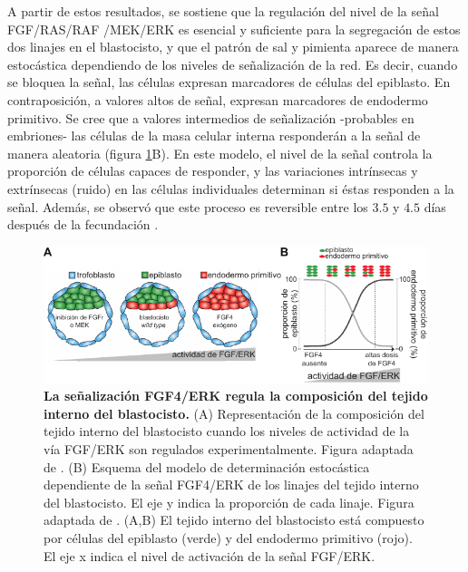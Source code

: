 \documentclass[./main.tex]{subfiles}
\begin{document}
A partir de estos resultados, se sostiene que la regulación del nivel de la señal FGF/RAS/RAF /MEK/ERK es esencial y suficiente para la segregación de estos dos linajes en el blastocisto, y que el patrón de sal y pimienta aparece de manera estocástica dependiendo de los niveles de señalización de la red. Es decir, cuando se bloquea la señal, las células expresan marcadores de células del epiblasto. En contraposición, a valores altos de señal, expresan marcadores de endodermo primitivo. Se cree que a valores intermedios de señalización -probables en embriones- las células de la masa celular interna responderán a la señal de manera aleatoria (figura \ref{C1_fig:saltandpepper}B). En este modelo, el nivel de la señal controla la proporción de células capaces de responder, y las variaciones intrínsecas y extrínsecas (ruido) en las células individuales determinan si éstas responden a la señal. Además, se observó que este proceso es reversible entre los $3.5$ y $4.5$ días después de la fecundación \cite{Yamanaka2010,Pokrass2020}.

\begin{figure}
    \centering
    \includegraphics[width=1\columnwidth]{figures/chapter1/C1_saltandpepper.pdf} 
    \caption{\textbf{La señalización FGF4/ERK regula la composición del tejido interno del blastocisto.} (A) Representación de la composición del tejido interno del blastocisto cuando los niveles de actividad de la vía FGF/ERK son regulados experimentalmente. Figura adaptada de \cite{Brewer2016}. (B) Esquema del modelo de determinación estocástica dependiente de la señal FGF4/ERK de los linajes del tejido interno del blastocisto. El eje y indica la proporción de cada linaje. Figura adaptada de \cite{Yamanaka2010}. (A,B) El tejido interno del blastocisto está compuesto por células del epiblasto (verde) y del endodermo primitivo (rojo). El eje x indica el nivel de activación de la señal FGF/ERK.}
    \label{C1_fig:saltandpepper}
\end{figure}


\end{document}
